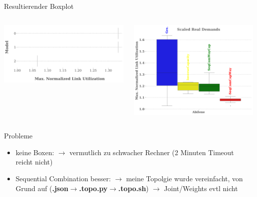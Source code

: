 \documentclass[aspectratio=169,10pt]{beamer}
\begin{document}
\begin{frame}{Resultierender Boxplot}
\begin{columns}
\begin{column}[t]{0.5\paperwidth}
\includegraphics[width=\textwidth]{images/pouria3.pdf}
\end{column}
\begin{column}[t]{0.5\paperwidth}
\includegraphics[width=\textwidth]{images/pouria_real_demands.pdf}
\end{column}
\end{columns}
\end{frame}
\begin{frame}{Probleme}
\Large
\begin{itemize}
    \item keine Boxen:\newline
    $\rightarrow$ vermutlich zu schwacher Rechner (2 Minuten Timeout reicht nicht)
    \item Sequential Combination besser:\newline
    $\rightarrow$ meine Topolgie wurde vereinfacht, von Grund auf (\textbf{.json}$\rightarrow$\textbf{.topo.py}$\rightarrow$\textbf{.topo.sh})\newline
    $\rightarrow$ Joint/Weights evtl nicht
\end{itemize}
\end{frame}
\end{document}
